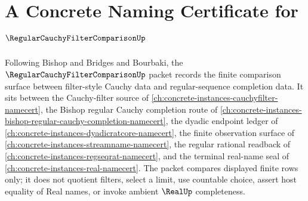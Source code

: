 \chapter{A Concrete Naming Certificate for $\RegularCauchyFilterComparisonUp$}
\label{ch:concrete-instances-regular-cauchy-filter-comparison-namecert}

Following Bishop and Bridges and Bourbaki, the $\RegularCauchyFilterComparisonUp$ packet records the finite comparison surface between filter-style Cauchy data and regular-sequence completion data. It sits between the Cauchy-filter source of \autoref{ch:concrete-instances-cauchyfilter-namecert}, the Bishop regular Cauchy completion route of \autoref{ch:concrete-instances-bishop-regular-cauchy-completion-namecert}, the dyadic endpoint ledger of \autoref{ch:concrete-instances-dyadicratcore-namecert}, the finite observation surface of \autoref{ch:concrete-instances-streamname-namecert}, the regular rational readback of \autoref{ch:concrete-instances-regseqrat-namecert}, and the terminal real-name seal of \autoref{ch:concrete-instances-real-namecert}. The packet compares displayed finite rows only; it does not quotient filters, select a limit, use countable choice, assert host equality of Real names, or invoke ambient $\RealUp$ completeness.


